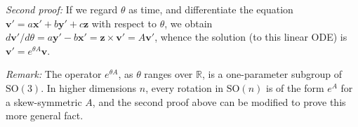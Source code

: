 \documentclass[12pt]{article}
\newcommand{\real}{\mathbb{R}}
\newcommand{\bx}{\mathbf{x}}
\newcommand{\by}{\mathbf{y}}
\newcommand{\bz}{\mathbf{z}}
\newcommand{\bv}{\mathbf{v}}
\begin{document}
\emph{Second proof:}
If we regard $\theta$ as time, and differentiate the equation 
$\bv' = a\bx' + b\by' + c\bz$ with respect to $\theta$, we obtain
$d\bv'/d\theta = a\by' - b\bx' = \bz \times \bv' = A \bv'$, whence the solution (to this linear ODE)
is $\bv' = e^{\theta A} \bv$. 

\emph{Remark:} The operator $e^{\theta A}$, as $\theta$ ranges over $\real$,
is a one-parameter subgroup of $\mathrm{SO}(3)$.
In higher dimensions $n$, every rotation in $\mathrm{SO}(n)$ is of the form
$e^A$ for a skew-symmetric $A$, and the second proof above
can be modified to prove this more general fact.
\end{document}

